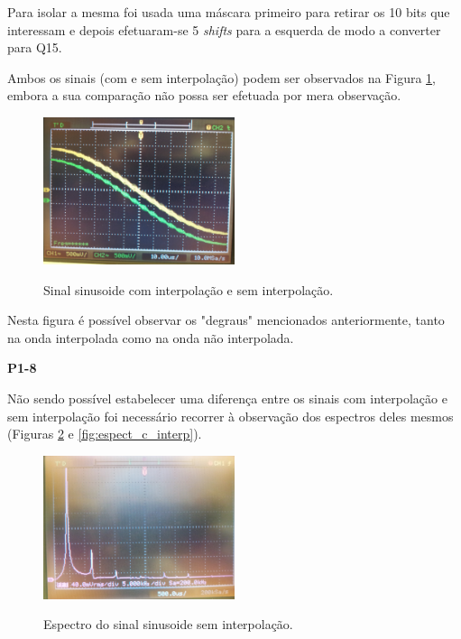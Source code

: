 \documentclass[11pt]{article}
\begin{document}
Para isolar a mesma foi usada uma máscara primeiro para retirar os 10 bits que interessam e depois efetuaram-se 5 \textit{shifts} para a esquerda de modo a converter para Q15.

Ambos os sinais (com e sem interpolação) podem ser observados na Figura \ref{fig:interp}, embora a sua comparação não possa ser efetuada por mera observação.

\begin{figure}[H]
	\centering
	\includegraphics[width=0.5\textwidth]{./P1_interp}~\\
	\caption{Sinal sinusoide com interpolação e sem interpolação.}
	\label{fig:interp}
\end{figure}
Nesta figura é possível observar os "degraus" mencionados anteriormente, tanto na onda interpolada como na onda não interpolada.
\vspace{2 mm}

\textbf{P1-8}

Não sendo possível estabelecer uma diferença entre os sinais com interpolação e sem interpolação foi necessário recorrer à observação dos espectros deles mesmos (Figuras \ref{fig:espect_s_interp} e \ref{fig:espect_c_interp}).

\begin{figure}[H]
	\centering
	\includegraphics[width=0.5\textwidth]{./P1-8_espect_s_interp}~\\
	\caption{Espectro do sinal sinusoide sem interpolação.}
	\label{fig:espect_s_interp}
\end{figure}
\end{document}
